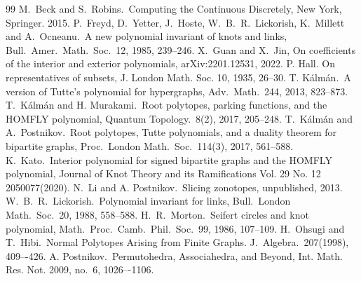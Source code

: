 \documentclass{amsart}
\theoremstyle{definition}
\theoremstyle{remark}
\numberwithin{equation}{section}
\begin{document}
\begin{thebibliography}{99}	
M.\ Beck and S.\ Robins.\ Computing the Continuous Discretely, New York, Springer. 2015.
P.\ Freyd, D.\ Yetter, J.\ Hoste, W.\ B.\ R.\ Lickorish, K.\ Millett and A.\ Ocneanu.\ A new polynomial invariant of knots and links, Bull.\ Amer.\ Math.\ Soc.\ 12, 1985, 239--246.
 X.\ Guan and X.\ Jin, On coefficients of the interior and exterior polynomials, arXiv:2201.12531, 2022.
P. Hall. On representatives of subsets, J. London Math. Soc. 10, 1935, 26--30.
T. K\'alm\'an.\ A version of Tutte's polynomial for hypergraphs, Adv.\ Math.\ 244, 2013, 823--873.
T.\ K\'alm\'an and H. Murakami.\ Root polytopes, parking functions, and the HOMFLY polynomial, Quantum Topology.\ 8(2), 2017, 205--248.
T.\ K\'alm\'an and A.\ Postnikov.\ Root polytopes, Tutte polynomials, and a duality theorem for bipartite graphs, Proc.\ London Math.\ Soc.\ 114(3), 2017, 561--588.
K.\ Kato.\ Interior polynomial for signed bipartite graphs and the HOMFLY polynomial, Journal of Knot Theory and its Ramifications Vol. 29 No. 12 2050077(2020).
N.\ Li and A. Postnikov.\ Slicing zonotopes, unpublished, 2013.
W.\ B.\ R.\ Lickorish.\ Polynomial invariant for links, Bull.\ London Math.\ Soc.\ 20, 1988, 558--588.
H.\ R.\ Morton.\ Seifert circles and knot polynomial, Math.\ Proc.\ Camb.\ Phil.\ Soc.\ 99, 1986, 107--109.
H.\ Ohsugi and T.\ Hibi.\ Normal Polytopes Arising from Finite Graphs. J.\ Algebra.\ 207(1998), 409–-426.
A. Postnikov.\ Permutohedra, Associahedra, and Beyond, Int. Math. Res. Not. 2009, no.\ 6, 1026–-1106.
\end{thebibliography}
\end{document}
